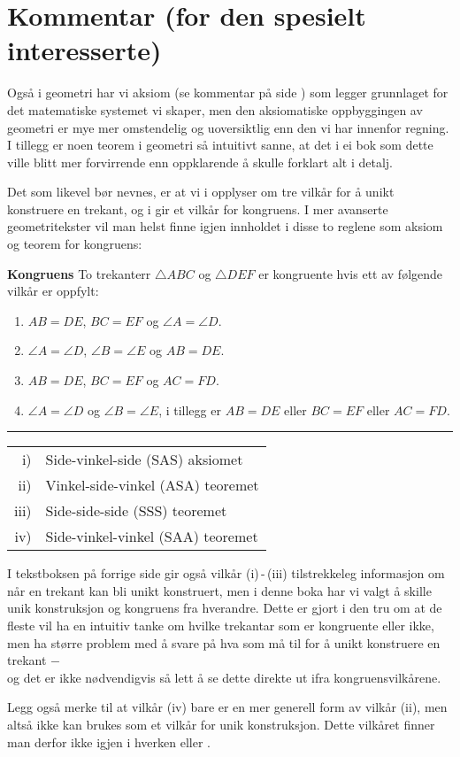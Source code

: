 



\section*{Kommentar (for den spesielt interesserte)}
Også i geometri har vi aksiom (se kommentar på side \pageref{Kommentar1}) som legger grunnlaget for det matematiske systemet vi skaper, men den aksiomatiske oppbyggingen av geometri er mye mer omstendelig og uoversiktlig enn den vi har innenfor regning. I tillegg er noen teorem i geometri så intuitivt sanne, at det i ei bok som dette ville blitt mer forvirrende enn oppklarende å skulle forklart alt i detalj.\vsk

Det som likevel bør nevnes, er at vi i  opplyser om tre vilkår for å unikt konstruere en trekant, og i  gir et vilkår for kongruens. I mer avanserte geometritekster vil man helst finne igjen innholdet i disse to reglene som aksiom og teorem for kongruens: \regv

\begin{tcolorbox}[boxrule=0.3 mm,arc=0mm,colback=blue!5] {\large \textbf{Kongruens} \vspace{5 pt}}\newline
	To trekanterr $ \triangle ABC $ og $ \triangle DEF $ er kongruente hvis ett av følgende vilkår er oppfylt:
	\begin{enumerate}[label=\roman*)]
		\item $ AB=DE $, $ BC=EF $ og $ \angle A=\angle D $.
		\item $ \angle A=\angle D $, $ \angle B=\angle E $ og $ AB=DE $.
		\item $ AB=DE $, $ BC=EF $ og $ AC=FD $.
		\item $ {\angle A=\angle D} $ og $ {\angle B=\angle E} $, i tillegg er $ {AB=DE} $ eller $ BC=EF $ eller $ AC=FD $.
	\end{enumerate}
\rule{1\linewidth}{0.75bp}
\begin{center}
	\begin{tabular}{rl}
		i) &Side-vinkel-side (SAS) aksiomet\\
		ii) &Vinkel-side-vinkel (ASA) teoremet\\
		iii) & Side-side-side (SSS) teoremet \\
		iv) & Side-vinkel-vinkel (SAA) teoremet 
	\end{tabular}
\end{center}
\end{tcolorbox}
\newpage
I tekstboksen på forrige side gir også vilkår (i)\,-\,(iii) tilstrekkeleg informasjon om når en trekant kan bli unikt konstruert, men i denne boka har vi valgt å skille unik konstruksjon og kongruens fra hverandre. Dette er gjort i den tru om at de fleste vil ha en intuitiv tanke om hvilke trekantar som er kongruente eller ikke, men ha større problem med å svare på hva som må til for å unikt konstruere en trekant $ - $ \\og det er ikke nødvendigvis så lett å se dette direkte ut ifra kongruensvilkårene.\vsk

Legg også merke til at vilkår (iv) bare er en mer generell form av vilkår (ii), men altså ikke kan brukes som et vilkår for unik konstruksjon. Dette vilkåret finner man derfor ikke igjen i hverken  eller .


